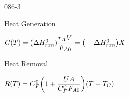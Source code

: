 \begin{mitframe}{086-3}

        
	\begin{listone}
		
        \item Heat Generation
        
        \item $\gibbs(\Temp)=(\iipf\enthalpy^0_{rxn})\dfrac{\pos_{\helmholtz}\vol}{\force_{\helmholtz\init}}=\big(-\iipf\enthalpy^0_{rxn}\big)X$
        
        \item Heat Removal
        
        \item $\gasconst(\Temp)=\cp^0\bigg(1+\dfrac{\uvel\helmholtz}{\cp^0\force_{\helmholtz\init}}\bigg)(\Temp-\Temp_{\conc})$
	
    \end{listone}        

\end{mitframe}